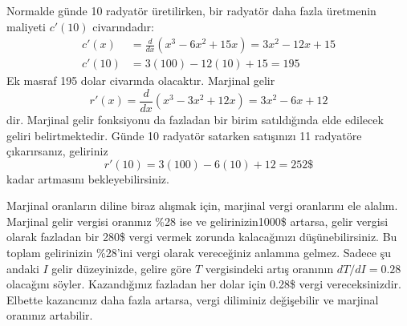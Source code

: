 \begin{cozum}
Normalde günde 10 radyatör üretilirken, bir radyatör daha fazla üretmenin maliyeti $c'(10)$ civarındadır:
	\begin{equation*}
	\begin{split}
	c'(x)&=\frac{d}{dx}(x^3-6x^2+15x)=3x^2-12x+15\\
	c'(10)&=3(100)-12(10)+15=195
	\end{split}
	\end{equation*}
Ek masraf 195 dolar civarında olacaktır. Marjinal gelir
	\begin{equation*}
	r'(x)=\frac{d}{dx}(x^3-3x^2+12x)=3x^2-6x+12
	\end{equation*}
dir. Marjinal gelir fonksiyonu da fazladan bir birim satıldığında elde edilecek geliri belirtmektedir. Günde 10 radyatör satarken satışınızı 11 radyatöre çıkarırsanız, geliriniz
	\begin{equation*}
	r'(10)=3(100)-6(10)+12=252 \$
	\end{equation*}
kadar artmasını bekleyebilirsiniz.
\end{cozum}
\begin{ornek}
Marjinal oranların diline biraz alışmak için, marjinal vergi oranlarını ele alalım. Marjinal gelir vergisi oranınız \%28 ise ve gelirinizin1000\$ artarsa, gelir vergisi olarak fazladan bir 280\$ vergi vermek zorunda kalacağınızı düşünebilirsiniz. Bu toplam gelirinizin \%28'ini vergi olarak vereceğiniz anlamına gelmez. Sadece şu andaki $I$ gelir düzeyinizde, gelire göre $T$ vergisindeki artış oranının $dT/dI=0.28$ olacağını söyler. Kazandığınız fazladan her dolar için 0.28\$ vergi vereceksinizdir. Elbette kazancınız daha fazla artarsa, vergi diliminiz değişebilir ve marjinal oranınız artabilir.
\end{ornek}
